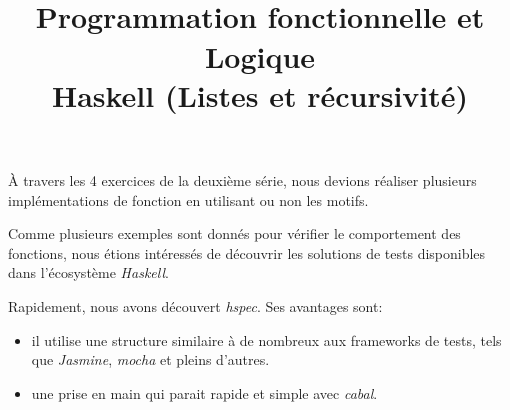 


\title{
    \unilogo[0.3\textwidth]\\[0.9cm]
    Programmation fonctionnelle et Logique\\Haskell (Listes et récursivité)
}

\author{\thestudent\theprof}

\lhead{\unilogo}
\rhead{\thestudent\\\theseriesnumber}



% 


\raggedbottom %


\maketitle

%
%
\section*{\theseriesnumber}

À travers les 4 exercices de la deuxième série,
nous devions réaliser plusieurs implémentations de fonction en utilisant ou non les motifs.

Comme plusieurs exemples sont donnés pour vérifier le comportement des fonctions,
nous étions intéressés de découvrir les solutions de tests disponibles dans l'écosystème \emph{Haskell}.

Rapidement, nous avons découvert \emph{hspec}.
Ses avantages sont:
\begin{itemize}
    \item il utilise une structure similaire à de nombreux aux frameworks de tests, tels que \emph{Jasmine}, \emph{mocha} et pleins d'autres.
    \item une prise en main qui parait rapide et simple avec \emph{cabal}.
\end{itemize}

